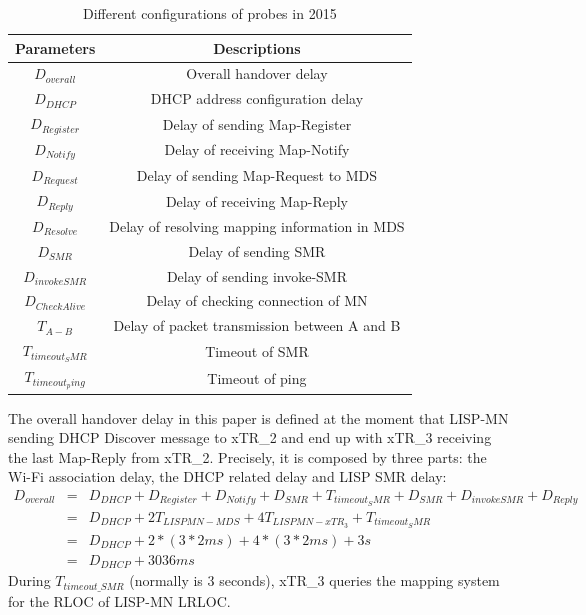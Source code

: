 \begin{table}[!tb]
	\centering
	\caption{Different configurations of probes in 2015}
	\label{Probes_config_2015}{
		\begin{tabular}{@{}|c|c|@{}}
			\hline\hline
			Parameters & Descriptions   \\ \hline
			$D_{overall}$ & Overall handover delay	\\  \hline    
			$D_{DHCP}$ &  DHCP address configuration delay \\  \hline    
			$D_{Register}$ &  Delay of sending Map-Register      	\\  \hline
			$D_{Notify}$ &  Delay of receiving Map-Notify      	\\  \hline           
			$D_{Request}$ &  Delay of sending Map-Request to MDS      	\\  \hline   
			$D_{Reply}$ &  Delay of receiving Map-Reply      	\\  \hline      
			$D_{Resolve}$ &  Delay of resolving mapping information in MDS      	\\  \hline               
			$D_{SMR}$ &  Delay of sending SMR       	\\  \hline 
			$D_{invokeSMR}$ &  Delay of sending invoke-SMR \\  \hline 
			$D_{CheckAlive}$ &  Delay of checking connection of MN      	\\  \hline
			$T_{A-B}$ &  Delay of packet transmission between A and B     	\\  \hline
			$T_{timeout_SMR}$ &  Timeout of SMR     	\\  \hline
			$T_{timeout_ping}$ &  Timeout of ping     	\\  \hline  \hline               
		
	\end{tabular}
	}
\end{table}

The overall handover delay in this paper is defined at the moment that LISP-MN sending DHCP Discover message to xTR\_2 and end up with xTR\_3 receiving the last Map-Reply from xTR\_2. Precisely, it is composed by three parts: the Wi-Fi association delay, the DHCP related delay and LISP SMR delay:
\begin{eqnarray}
D_{overall} &=& D_{DHCP} + D_{Register} + D_{Notify} + D_{SMR} + T_{timeout_SMR} + D_{SMR} + D_{invokeSMR} + D_{Reply} \nonumber \\
&=& D_{DHCP} + 2T_{LISPMN-MDS} + 4T_{LISPMN-xTR_3} + T_{timeout_SMR}\nonumber \\
&=& D_{DHCP} + 2* (3*2ms) + 4*(3*2ms) + 3s\nonumber \\
&=& D_{DHCP} + 3036 ms
\end{eqnarray}
During $T_{timeout\_SMR}$ (normally is 3 seconds), xTR\_3 queries the mapping system for the RLOC of LISP-MN LRLOC.


